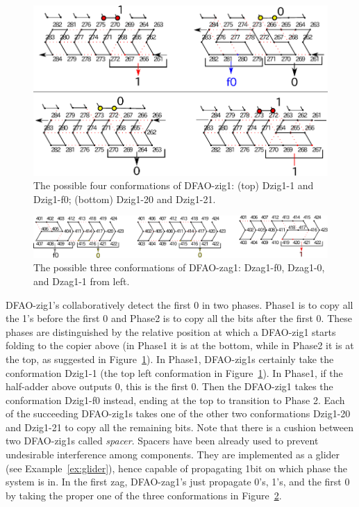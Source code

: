 \begin{figure}[h]
\centering
\includegraphics[width=0.7\linewidth]{pic/Dzig1.pdf}
  \caption{The possible four conformations of DFAO-zig1: (top) Dzig1-1 and Dzig1-f0; (bottom) Dzig1-20 and Dzig1-21.}
  \label{fig:DFAO-zig1}
\end{figure} 

\begin{figure}[h]
\centering
\includegraphics[width=\linewidth]{pic/Dzag1.pdf}
  \caption{The possible three conformations of DFAO-zag1: Dzag1-f0, Dzag1-0, and Dzag1-1 from left.}
  \label{fig:DFAO-zag1}
\end{figure} 

DFAO-zig1's collaboratively detect the first 0 in two phases.
Phase1 is to copy all the 1's before the first 0 and Phase2 is to copy all the bits after the first 0.
These phases are distinguished by the relative position at which a DFAO-zig1 starts folding to the copier above (in Phase1 it is at the bottom, while in Phase2 it is at the top, as suggested in Figure~\ref{fig:DFAO-zig1}).
In Phase1, DFAO-zig1s certainly take the conformation Dzig1-1 (the top left conformation in Figure~\ref{fig:DFAO-zig1}).
In Phase1, if the half-adder above outputs 0, this is the first 0. 
Then the DFAO-zig1 takes the conformation Dzig1-f0 instead, ending at the top to transition to Phase 2.
Each of the succeeding DFAO-zig1s takes one of the other two conformations Dzig1-20 and Dzig1-21 to copy all the remaining bits. 
Note that there is a cushion between two DFAO-zig1s called \textit{spacer}.
Spacers have been already used to prevent undesirable interference among components.
They are implemented as a glider (see Example~\ref{ex:glider}), hence capable of propagating 1bit on which phase the system is in.
In the first zag, DFAO-zag1's just propagate 0's, 1's, and the first 0 by taking the proper one of the three conformations in Figure~\ref{fig:DFAO-zag1}.

